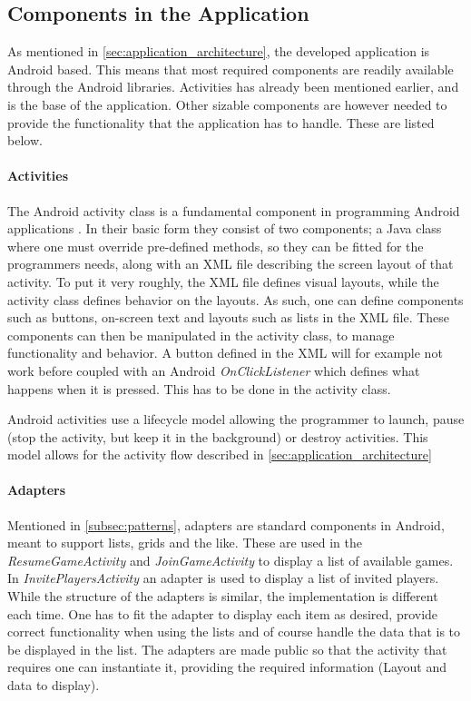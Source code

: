 \subsection{Components in the Application} \label{subsec:components}
As mentioned in \ref{sec:application_architecture}, the developed application is Android based. This means that most required components are readily available through the Android libraries. Activities has already been mentioned earlier, and is the base of the application. Other sizable components are however needed to provide the functionality that the application has to handle. These are listed below.

\paragraph{Activities}
The Android activity class is a fundamental component in programming Android applications \cite{android-activity}. In their basic form they consist of two components; a Java class where one must override pre-defined methods, so they can be fitted for the programmers needs, along with an XML file describing the screen layout of that activity. To put it very roughly, the XML file defines visual layouts, while the activity class defines behavior on the layouts. As such, one can define components such as buttons, on-screen text and layouts such as lists in the XML file. These components can then be manipulated in the activity class, to manage functionality and behavior. A button defined in the XML will for example not work before coupled with an Android \textit{OnClickListener} which defines what happens when it is pressed. This has to be done in the activity class.

Android activities use a lifecycle model allowing the programmer to launch, pause (stop the activity, but keep it in the background) or destroy activities. This model allows for the activity flow described in \ref{sec:application_architecture}

\paragraph{Adapters}
Mentioned in \ref{subsec:patterns}, adapters are standard components in Android, meant to support lists, grids and the like. These are used in the \textit{ResumeGameActivity} and \textit{JoinGameActivity} to display a list of available games. In \textit{InvitePlayersActivity} an adapter is used to display a list of invited players. While the structure of the adapters is similar, the implementation is different each time. One has to fit the adapter to display each item as desired, provide correct functionality when using the lists and of course handle the data that is to be displayed in the list. The adapters are made public so that the activity that requires one can instantiate it, providing the required information (Layout and data to display).

